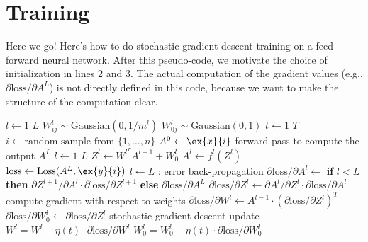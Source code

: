 \section{Training}
Here we go!  Here's how to do stochastic gradient descent training on
a feed-forward neural network.   After this pseudo-code, we motivate
the choice of initialization in lines 2 and 3.  The actual
computation of the gradient values (e.g., $\partial\text{loss}/
  \partial A^L$) is not directly defined in this code, because we want
to make the structure of the computation clear.

\begin{codebox}
    \li     \For $l \gets 1$ \To $L$
    \Do
    \li        $W_{ij}^l \sim \text{Gaussian}(0, 1/m^l)$
    \li        $W_{0j}^l \sim \text{Gaussian}(0, 1)$
    \End
    \li \For $t \gets 1$ \To $T$
    \li   \Do
  $i \gets \text{random sample from } \{1,\ldots,n\}$
    \li     $A^0 \gets \ex{x}{i}$
    \li     \Comment forward pass to compute the output $A^L$
    \li     \For $l \gets 1$ \To $L$
    \li       \Do
  $Z^l \gets W^{l^T}A^{l-1} + W_0^l$
    \li         $A^l \gets f^l(Z^l)$
    \End
    \li     $\text{loss} \gets \text{Loss}(A^L, \ex{y}{i})$
    \li     \For $l \gets L$ :
    \Do
    \li       \Comment error back-propagation
    \li       $\partial \text{loss}/\partial A^l \gets$ 	%
    {\bf if} $l < L$
    {\bf then}
  $\partial Z^{l+1}/\partial A^l \cdot \partial \text{loss}/\partial Z^{l+1} $
    {\bf else}
  $ \partial \text{loss}/\partial A^L$
    \li       $\partial \text{loss}/\partial Z^l \gets \partial
  A^l/\partial Z^l  \cdot \partial
  \text{loss}/\partial A^l$
    \li       \Comment compute gradient with respect to weights
    \li       $\partial \text{loss}/\partial W^l  \gets        A^{l-1}      \cdot    \left( \partial \text{loss}/\partial Z^l  \right)^T $
    \li       $\partial \text{loss}/\partial W_0^l \gets       \partial \text{loss}/\partial Z^l $
    \li       \Comment stochastic gradient descent update
    \li       $W^l = W^l - \eta(t)\cdot \partial \text{loss}/\partial W^l$
    \li       $W^l_0 = W_0^l - \eta(t)\cdot \partial \text{loss}/\partial W_0^l$
  \End
\end{codebox}

